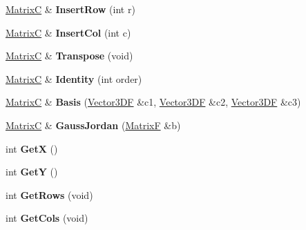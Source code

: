 \begin{DoxyCompactItemize}
\item 
\hypertarget{class_matrix_c_a13479448771fe8ef8bb1e52b4872641b}{\hyperlink{class_matrix_c}{Matrix\+C} \& {\bfseries Insert\+Row} (int r)}\label{class_matrix_c_a13479448771fe8ef8bb1e52b4872641b}

\item 
\hypertarget{class_matrix_c_a7e4ecf09b33e9f5e2022eaa4fb5e78bc}{\hyperlink{class_matrix_c}{Matrix\+C} \& {\bfseries Insert\+Col} (int c)}\label{class_matrix_c_a7e4ecf09b33e9f5e2022eaa4fb5e78bc}

\item 
\hypertarget{class_matrix_c_ad187b62a5c107d16b4980b92c82cae03}{\hyperlink{class_matrix_c}{Matrix\+C} \& {\bfseries Transpose} (void)}\label{class_matrix_c_ad187b62a5c107d16b4980b92c82cae03}

\item 
\hypertarget{class_matrix_c_a0dab8bbb2066e39b9c8769c780ea711b}{\hyperlink{class_matrix_c}{Matrix\+C} \& {\bfseries Identity} (int order)}\label{class_matrix_c_a0dab8bbb2066e39b9c8769c780ea711b}

\item 
\hypertarget{class_matrix_c_a6a5ac6eae88328a6783e8609f3b05787}{\hyperlink{class_matrix_c}{Matrix\+C} \& {\bfseries Basis} (\hyperlink{class_vector3_d_f}{Vector3\+D\+F} \&c1, \hyperlink{class_vector3_d_f}{Vector3\+D\+F} \&c2, \hyperlink{class_vector3_d_f}{Vector3\+D\+F} \&c3)}\label{class_matrix_c_a6a5ac6eae88328a6783e8609f3b05787}

\item 
\hypertarget{class_matrix_c_a1418755150a10ec48a745412771e43ed}{\hyperlink{class_matrix_c}{Matrix\+C} \& {\bfseries Gauss\+Jordan} (\hyperlink{class_matrix_f}{Matrix\+F} \&b)}\label{class_matrix_c_a1418755150a10ec48a745412771e43ed}

\item 
\hypertarget{class_matrix_c_a5da703116d77b29147d80bd48d44938f}{int {\bfseries Get\+X} ()}\label{class_matrix_c_a5da703116d77b29147d80bd48d44938f}

\item 
\hypertarget{class_matrix_c_a7c4a7ad3bb8b89a36a767e9fff4f95e6}{int {\bfseries Get\+Y} ()}\label{class_matrix_c_a7c4a7ad3bb8b89a36a767e9fff4f95e6}

\item 
\hypertarget{class_matrix_c_ab0bf30661768e8fa8dc1aa8dac08fb59}{int {\bfseries Get\+Rows} (void)}\label{class_matrix_c_ab0bf30661768e8fa8dc1aa8dac08fb59}

\item 
\hypertarget{class_matrix_c_aafc9b77c864db6712b24f6fe9a4770a3}{int {\bfseries Get\+Cols} (void)}\label{class_matrix_c_aafc9b77c864db6712b24f6fe9a4770a3}


\end{DoxyCompactItemize}
